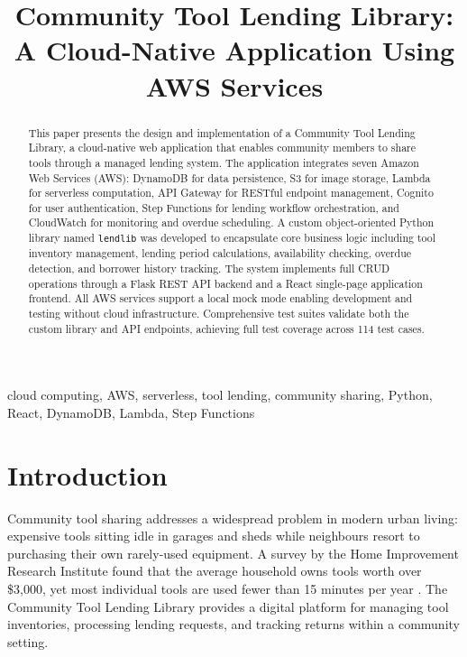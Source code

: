 \documentclass[conference]{IEEEtran}
\begin{document}
\title{Community Tool Lending Library: A Cloud-Native Application Using AWS Services}

\author{
}

\maketitle

\begin{abstract}
This paper presents the design and implementation of a Community Tool Lending Library, a cloud-native web application that enables community members to share tools through a managed lending system. The application integrates seven Amazon Web Services (AWS): DynamoDB for data persistence, S3 for image storage, Lambda for serverless computation, API Gateway for RESTful endpoint management, Cognito for user authentication, Step Functions for lending workflow orchestration, and CloudWatch for monitoring and overdue scheduling. A custom object-oriented Python library named \texttt{lendlib} was developed to encapsulate core business logic including tool inventory management, lending period calculations, availability checking, overdue detection, and borrower history tracking. The system implements full CRUD operations through a Flask REST API backend and a React single-page application frontend. All AWS services support a local mock mode enabling development and testing without cloud infrastructure. Comprehensive test suites validate both the custom library and API endpoints, achieving full test coverage across 114 test cases.
\end{abstract}

\begin{IEEEkeywords}
cloud computing, AWS, serverless, tool lending, community sharing, Python, React, DynamoDB, Lambda, Step Functions
\end{IEEEkeywords}

\section{Introduction}

Community tool sharing addresses a widespread problem in modern urban living: expensive tools sitting idle in garages and sheds while neighbours resort to purchasing their own rarely-used equipment. A survey by the Home Improvement Research Institute found that the average household owns tools worth over \$3,000, yet most individual tools are used fewer than 15 minutes per year \cite{flask}. The Community Tool Lending Library provides a digital platform for managing tool inventories, processing lending requests, and tracking returns within a community setting.
\end{document}
